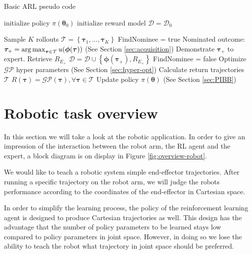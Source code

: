 \documentclass[mscThesis.tex]{subfiles}
\begin{document}
\begin{algorithm}[!ht]
\caption{Basic ARL pseudo code}
\label{alg:ARL}
\begin{algorithmic}
\State initialize policy $\pi(\bm{\theta}_0)$
\State initialize reward model $\mathcal{D} = \mathcal{D}_0$

\State


\State Sample $K$ rollouts
\State $\mathcal{T} = \left\{\bm{\tau}_1, ..., \bm{\tau}_K \right\}$
\State
\State FindNominee = true
\State Nominated outcome:
\State $\bm{\tau}_+ = \operatorname*{arg\,max}_{\bm{\tau} \in \mathcal{T}} u(\bm{\phi}(\bm{\tau}))$  (See Section \ref{sec:acquisition})
\State
{}
\State Demonstrate $\bm{\tau}_+$ to expert. Retrieve $R_{E_+}$
\State $\mathcal{D} = \mathcal{D} \cup \left\{ \bm{\phi}(\bm{\tau}_+), R_{E_+} \right\}$
\Else
\State FindNominee = false
\EndIf 
\EndWhile
\State Optimize $\mathcal{GP}$ hyper parameters (See Section \ref{sec:hyper-opt})
\State
\State Calculate return trajectories $\mathcal{T}$
\State $R(\bm{\tau}) = \mathcal{GP} (\bm{\tau}), \forall \bm{\tau} \in \mathcal{T}$
\State Update policy $\pi (\bm{\theta})$ (See Section \ref{sec:PIBB})
\EndWhile
\end{algorithmic}
\end{algorithm}

\section{Robotic task overview}
\label{sec:robotic-task}
In this section we will take a look at the robotic application. In order to give an impression of the interaction between the robot arm, the RL agent and the expert, a block diagram is on display in Figure \ref{fig:overview-robot}. 

We would like to teach a robotic system simple end-effector trajectories. After running a specific trajectory on the robot arm, we will judge the robots performance according to the coordinates of the end-effector in Cartesian space. 

In order to simplify the learning process, the policy of the reinforcement learning agent is designed to produce Cartesian trajectories as well. This design has the advantage that the number of policy parameters to be learned stays low compared to policy parameters in joint space. However, in doing so we lose the ability to teach the robot what trajectory in joint space should be preferred. 
\end{document}
